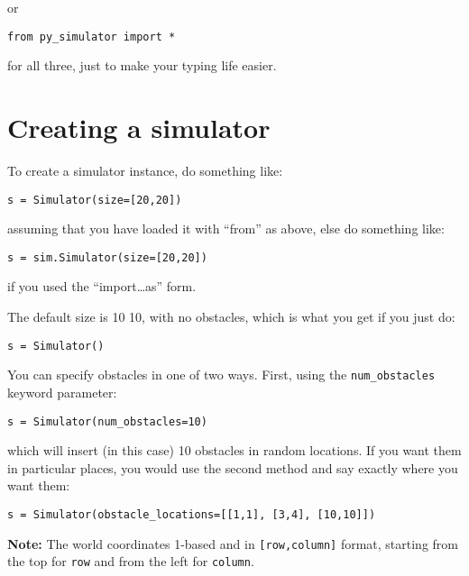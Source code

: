\documentclass[11pt]{tufte-handout}
\begin{document}
or
\begin{verbatim}
from py_simulator import *
\end{verbatim}

\noindent for all three, just to make your typing life easier.

\section{Creating a simulator}
\label{sec:org7f288c5}

To create a simulator instance, do something like:
\begin{verbatim}
s = Simulator(size=[20,20])
\end{verbatim}

\noindent assuming that you have loaded it with ``from'' as above, else do something like:
\begin{verbatim}
s = sim.Simulator(size=[20,20])
\end{verbatim}

\noindent if you used the ``import\ldots{}as'' form.

The default size is 10\texttimes{} 10, with no obstacles, which is what you get if you just do:
\begin{verbatim}
s = Simulator()
\end{verbatim}


You can specify obstacles in one of two ways.  First, using the \texttt{num\_obstacles} keyword parameter:
\begin{verbatim}
s = Simulator(num_obstacles=10)
\end{verbatim}

\noindent
\noindent which will insert (in this case) 10 obstacles in random locations.  If you want them in particular places, you would use the second method and say exactly where you want them:
\begin{verbatim}
s = Simulator(obstacle_locations=[[1,1], [3,4], [10,10]])
\end{verbatim}

\noindent \textbf{Note:} The world coordinates 1-based and in \texttt{[row,column]} format, starting from the top for \texttt{row} and from the left for \texttt{column}.
\end{document}
